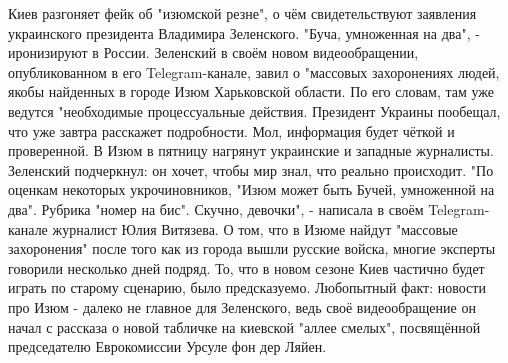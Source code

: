Киев разгоняет фейк об "изюмской резне", о чём свидетельствуют заявления украинского президента Владимира Зеленского. "Буча, умноженная на два", - иронизируют в России.
Зеленский в своём новом видеообращении, опубликованном в его Telegram-канале, завил о "массовых захоронениях людей, якобы найденных в городе Изюм Харьковской области. По его словам, там уже ведутся "необходимые процессуальные действия.
Президент Украины пообещал, что уже завтра расскажет подробности. Мол, информация будет чёткой и проверенной. В Изюм в пятницу нагрянут украинские и западные журналисты. Зеленский подчеркнул: он хочет, чтобы мир знал, что реально происходит.
"По оценкам некоторых укрочиновников, "Изюм может быть Бучей, умноженной на два". Рубрика "номер на бис". Скучно, девочки", - написала в своём Telegram-канале журналист Юлия Витязева.
О том, что в Изюме найдут "массовые захоронения" после того как из города вышли русские войска, многие эксперты говорили несколько дней подряд. То, что в новом сезоне Киев частично будет играть по старому сценарию, было предсказуемо.
Любопытный факт: новости про Изюм - далеко не главное для Зеленского, ведь своё видеообращение он начал с рассказа о новой табличке на киевской "аллее смелых", посвящённой председателю Еврокомиссии Урсуле фон дер Ляйен.

